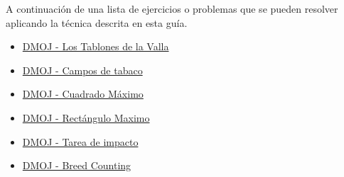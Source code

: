 A continuación de una lista de ejercicios o problemas que se pueden resolver aplicando la técnica descrita en esta guía.

\begin{itemize}
	\item \href{https://dmoj.uclv.edu.cu/problem/fence}{DMOJ - Los Tablones de la Valla}
	\item \href{https://dmoj.uclv.edu.cu/problem/tabaco}{DMOJ - Campos de tabaco}
	\item \href{https://dmoj.uclv.edu.cu/problem/sqr}{DMOJ - Cuadrado Máximo}
	\item \href{https://dmoj.uclv.edu.cu/problem/submtx}{DMOJ - Rectángulo Maximo}
	\item \href{https://dmoj.uclv.edu.cu/problem/tareas}{DMOJ - Tarea de impacto}
	\item \href{https://dmoj.uclv.edu.cu/problem/bcount}{DMOJ - Breed Counting}
\end{itemize}